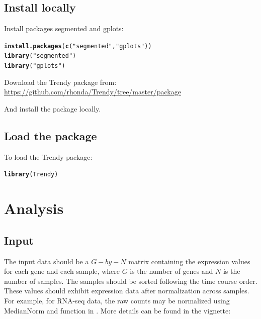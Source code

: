 \documentclass{article}\usepackage[]{graphicx}\usepackage[usenames,dvipsnames]{color}
\makeatletter
\newcommand{\hlstr}[1]{\textcolor[rgb]{0.192,0.494,0.8}{#1}}%
\newcommand{\hlstd}[1]{\textcolor[rgb]{0.345,0.345,0.345}{#1}}%
\newcommand{\hlkwd}[1]{\textcolor[rgb]{0.737,0.353,0.396}{\textbf{#1}}}%
\newenvironment{kframe}{%
 \def\at@end@of@kframe{}%
 \ifinner\ifhmode%
  \def\at@end@of@kframe{\end{minipage}}%
  \begin{minipage}{\columnwidth}%
 \fi\fi%
 \def\FrameCommand##1{\hskip\@totalleftmargin \hskip-\fboxsep
 \colorbox{shadecolor}{##1}\hskip-\fboxsep
     \hskip-\linewidth \hskip-\@totalleftmargin \hskip\columnwidth}%
 \MakeFramed {\advance\hsize-\width
   \@totalleftmargin\z@ \linewidth\hsize
   \@setminipage}}%
 {\par\unskip\endMakeFramed%
 \at@end@of@kframe}
\newenvironment{knitrout}{}{} %
\makeatother
\begin{document}
\subsection{Install locally}

Install packages segmented and gplots:


\begin{knitrout}
\color{fgcolor}\begin{kframe}
\begin{alltt}
\hlkwd{install.packages}\hlstd{(}\hlkwd{c}\hlstd{(}\hlstr{"segmented"}\hlstd{,}\hlstr{"gplots"}\hlstd{))}
\hlkwd{library}\hlstd{(}\hlstr{"segmented"}\hlstd{)}
\hlkwd{library}\hlstd{(}\hlstr{"gplots"}\hlstd{)}
\end{alltt}
\end{kframe}
\end{knitrout}

Download the Trendy package from: \url{https://github.com/rhonda/Trendy/tree/master/package}

And install the package locally.


\subsection{Load the package}

To load the Trendy package:
\begin{knitrout}
\color{fgcolor}\begin{kframe}
\begin{alltt}
\hlkwd{library}\hlstd{(Trendy)}
\end{alltt}
\end{kframe}
\end{knitrout}

\section{Analysis}

\subsection{Input}

The input data should be a $G-by-N$ matrix containing the expression values for each gene and
 each sample, where $G$ is the number of genes and $N$ is the number of samples. 
The samples should be sorted following the time course order.
These values should exhibit expression data after normalization across samples. 
For example, for RNA-seq data, the raw counts may be normalized using MedianNorm and
 function in . More details can be found in the  vignette:
\end{document}
